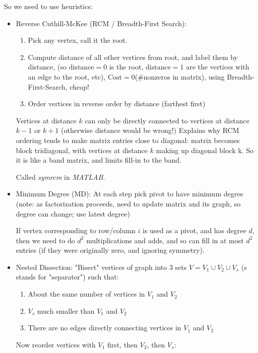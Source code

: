 \documentclass[11pt]{article}
\numberwithin{equation}{section}
\begin{document}
So we need to use heuristics:\begin{itemize}
    \item Reverse Cuthill-McKee (RCM / Breadth-First Search): \begin{enumerate}
        \item Pick any vertex, call it the root.
        \item Compute distance of all other vertices from root, and label them by distance, (so $\mathrm{distance}=0$ is the root, 
        $\mathrm{distance}=1$ are the vertices with an edge to the root, etc), $\mathrm{Cost}=0$(\#nonzeros in matrix), 
        using Breadth-First-Search, cheap!
        \item Order vertices in reverse order by distance (farthest first)
    \end{enumerate}
    \begin{fact}
        Vertices at distance $k$ can only be directly connected to vertices at distance $k-1$ or $k+1$ (otherwise distance would be wrong!)
        Explains why RCM ordering tends to make matrix entries close to diagonal: matrix becomes block tridiagonal,
         with vertices at distance $k$ making up diagonal block k. So it is like a band matrix, and limits fill-in to the band. 
    \end{fact}
    Called \textit{symrcm} in \textit{MATLAB}.
    \item Minimum Degree (MD): At each step pick pivot to have minimum degree (note: as factorization proceeds, need to update matrix and its graph, so degree can change; use latest degree)
    \begin{fact}
        If vertex corresponding to row/column $i$ is used as a pivot, and has degree $d$, then we need to do $d^2$ multiplications and adds, 
        and so can fill in at most $d^2$ entries (if they were originally zero, and ignoring symmetry).
    \end{fact}
    \item Nested Dissection: "Bisect" vertices of graph into 3 sets $V = V_1 \cup V_2 \cup V_s$ (s stands for "separator") such that:\begin{enumerate}
        \item About the same number of vertices in $V_1$ and $V_2$
        \item $V_s$ much smaller than $V_1$ and $V_2$
        \item There are no edges directly connecting vertices in $V_1$ and $V_2$
    \end{enumerate}
    Now reorder vertices with $V_1$ first, then $V_2$, then $V_s$:\begin{align*}

\end{align*}
\end{itemize}
\end{document}
